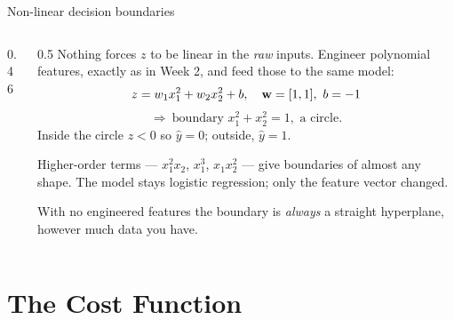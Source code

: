 \documentclass[aspectratio=169,10pt]{beamer}
\begin{document}
\begin{frame}{Non-linear decision boundaries}
  \begin{columns}[T,onlytextwidth]
    \begin{column}{0.46\textwidth}
      \centering
    \end{column}
    \begin{column}{0.5\textwidth}
      \footnotesize
      Nothing forces $z$ to be linear in the \emph{raw} inputs. Engineer polynomial features,
      exactly as in Week 2, and feed those to the same model:
      \[ z = w_1x_1^2 + w_2x_2^2 + b, \quad \vw=[1,1],\ b=-1 \]
      \[ \Rightarrow\ \text{boundary } x_1^2+x_2^2 = 1, \text{ a circle.} \]
      Inside the circle $z<0$ so $\hat y = 0$; outside, $\hat y = 1$.
      \vspace{1mm}
      \begin{keyidea}
        \footnotesize
        Higher-order terms --- $x_1^2x_2$, $x_1^3$, $x_1x_2^2$ --- give boundaries of almost
        any shape. The model stays logistic regression; only the feature vector changed.
      \end{keyidea}
      \vspace{1mm}
      With no engineered features the boundary is \emph{always} a straight hyperplane, however
      much data you have.
    \end{column}
  \end{columns}
\end{frame}

\section{The Cost Function}
\end{document}
